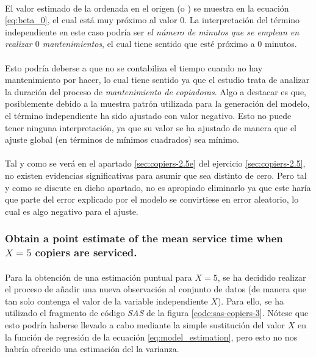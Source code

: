 \documentclass{article}
\begin{document}
        \paragraph{}
        El valor estimado de la ordenada en el origen (o ) se muestra en la ecuación \eqref{eq:beta_0}, el cual está muy próximo al valor $0$. La interpretación del término independiente en este caso podría ser \emph{el número de minutos que se emplean en realizar $0$ mantenimientos}, el cual tiene sentido que esté próximo a $0$ minutos.

        \paragraph{}
        Esto podría deberse a que no se contabiliza el tiempo cuando no hay mantenimiento por hacer, lo cual tiene sentido ya que el estudio trata de analizar la duración del proceso de \emph{mantenimiento de copiadoras}. Algo a destacar es que, posiblemente debido a la muestra patrón utilizada para la generación del modelo, el término independiente ha sido ajustado con valor negativo. Esto no puede tener ninguna interpretación, ya que su valor se ha ajustado de manera que el ajuste global (en términos de mínimos cuadrados) sea mínimo.

        \paragraph{}
        Tal y como se verá en el apartado \ref{sec:copiers-2.5e} del ejercicio \ref{sec:copiers-2.5}, no existen evidencias significativas para asumir que sea distinto de cero. Pero tal y como se discute en dicho apartado, no es apropiado eliminarlo ya que este haría que parte del error explicado por el modelo se convirtiese en error aleatorio, lo cual es algo negativo para el ajuste.


      \subsubsection{Obtain a point estimate of the mean service time when $X = 5$ copiers are serviced.}

        \paragraph{}
        Para la obtención de una estimación puntual para $X=5$, se ha decidido realizar el proceso de añadir una nueva observación al conjunto de datos (de manera que tan solo contenga el valor de la variable independiente $X$). Para ello, se ha utilizado el fragmento de código \emph{SAS} de la figura \ref{code:sas-copiers-3}. Nótese que esto podría haberse llevado a cabo mediante la simple sustitución del valor $X$ en la función de regresión de la ecuación \eqref{eq:model_estimation}, pero esto no nos habría ofrecido una estimación del la varianza.
\end{document}
